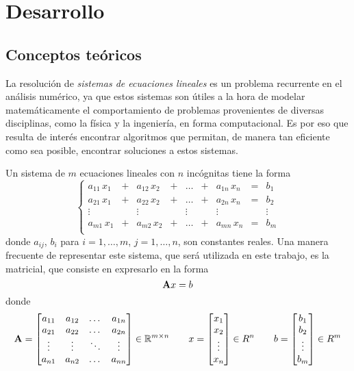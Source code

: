 \section{Desarrollo}

  \subsection{Conceptos teóricos}

    La resolución de \emph{sistemas de ecuaciones lineales} es un problema recurrente en el análisis numérico, ya que estos sistemas son útiles a la hora de modelar matemáticamente el comportamiento de problemas provenientes de diversas disciplinas, como la física y la ingeniería, en forma computacional. Es por eso que resulta de interés encontrar algoritmos que permitan, de manera tan eficiente como sea posible, encontrar soluciones a estos sistemas.

    Un sistema de $m$ ecuaciones lineales con $n$ incógnitas tiene la forma
    \[ \left\lbrace \begin{matrix}
        a_{11} \, x_1 & + & a_{12} \, x_2 & + & \dots  & + & a_{1n} \, x_n & = & b_1    \\
        a_{21} \, x_1 & + & a_{22} \, x_2 & + & \dots  & + & a_{2n} \, x_n & = & b_2    \\
        \vdots        &   & \vdots        &   & \vdots &   & \vdots        &   & \vdots \\
        a_{m1} \, x_1 & + & a_{m2} \, x_2 & + & \dots  & + & a_{mn} \, x_n & = & b_m    \\
    \end{matrix} \right. \]
    donde $a_{ij}$, $b_i$ para $i = 1, \dots, m$, $j = 1, \dots, n$, son constantes reales.
    Una manera frecuente de representar este sistema, que será utilizada en este trabajo, es la matricial, que consiste en expresarlo en la forma
    \[ \mathbf{A}x = b \]
    donde 
    \[ \mathbf{A} = \left[ \begin{matrix} a_{11} & a_{12} & \dots  & a_{1n} \\
                                       a_{21} & a_{22} & \dots  & a_{2n} \\
                                       \vdots & \vdots & \ddots & \vdots \\
                                       a_{n1} & a_{n2} & \dots  & a_{nn} \\ \end{matrix} \right] \in \mathbb{R}^{m \times n} \qquad
    x = \left[ \begin{matrix} x_1 \\ x_2 \\ \vdots \\ x_n \end{matrix} \right] \in {R}^n \qquad
    b = \left[ \begin{matrix} b_1 \\ b_2 \\ \vdots \\ b_m \end{matrix} \right] \in {R}^m \]

